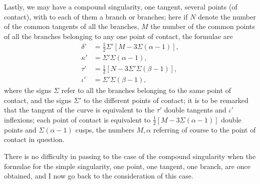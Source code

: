 \documentclass[11pt]{article}
\begin{document}
Lastly, we may have a compound singularity, one tangent, several points (of contact), with to each of them a branch or branches; here if $N$ denote the number of the common tangents of all the branches, $M$ the number of the common points of all the branches belonging to any one point of contact, the formulae are
\begin{align*}
\delta' &= \tfrac{1}{2}\Sigma'[M - 3\Sigma(\alpha - 1)],\\
\kappa' &= \Sigma'\Sigma(\alpha - 1),\\
\tau' &= \tfrac{1}{2}[N - 3\Sigma'\Sigma(\beta - 1)],\\
\iota' &= \Sigma'\Sigma(\beta - 1),
\end{align*}
where the signs $\Sigma$ refer to all the branches belonging to the same point of contact, and the signs $\Sigma'$ to the different points of contact; it is to be remarked that the tangent of the curve is equivalent to the $\tau'$ double tangents and $\iota'$ inflexions; each point of contact is equivalent to $\tfrac{1}{2}[M - 3\Sigma(\alpha - 1)]$ double points and $\Sigma(\alpha - 1)$ cusps, the numbers $M, \alpha$ referring of course to the point of contact in question.

There is no difficulty in passing to the case of the compound singularity when the formulae for the simple singularity, one point, one tangent, one branch, are once obtained, and I now go back to the consideration of this case.
\end{document}
